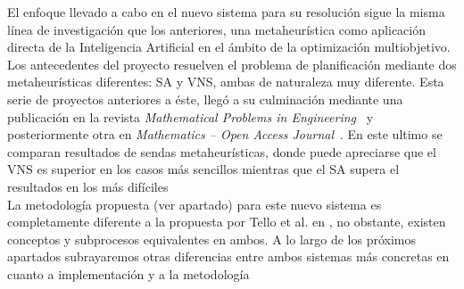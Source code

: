 El enfoque llevado a cabo en el nuevo sistema para su resolución sigue la misma línea de investigación que los 
anteriores, una metaheurística como aplicación directa de la Inteligencia Artificial en el ámbito de la optimización 
multiobjetivo.
Los antecedentes del proyecto resuelven el problema de planificación mediante dos metaheurísticas diferentes: 
\gls{SA} y \gls{VNS}, ambas de naturaleza muy diferente. 
Esta serie de proyectos anteriores a éste, llegó a su culminación mediante una publicación en la revista \textit{Mathematical Problems in Engineering}~\cite{articulo1} y posteriormente otra en \textit{Mathematics -- Open Access Journal}~\cite{articulo2}. 
En este ultimo se comparan resultados de sendas metaheurísticas, donde puede apreciarse que el VNS es superior en los casos más sencillos 
mientras que el SA supera el resultados en los más difíciles %
\\

La metodología propuesta (ver apartado) para este nuevo sistema es completamente diferente a la propuesta por Tello et al. en \cite{articulo1}, no obstante, existen conceptos y subprocesos equivalentes en ambos. A lo largo de los próximos apartados subrayaremos otras diferencias entre ambos sistemas más concretas en cuanto a implementación y a la metodología















